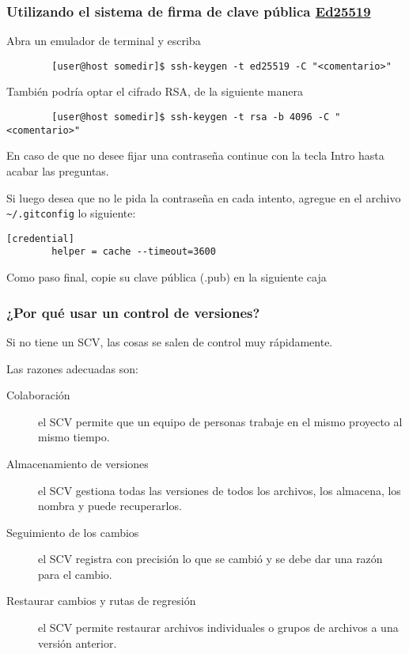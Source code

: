 \begin{frame}[fragile]
	\frametitle{Utilizando el sistema de firma de clave pública \href{https://ed25519.cr.yp.to}{Ed25519}}

	Abra un emulador de terminal y escriba

	\begin{verbatim}
		[user@host somedir]$ ssh-keygen -t ed25519 -C "<comentario>"
	\end{verbatim}

	También podría optar el cifrado RSA, de la siguiente manera

	\begin{verbatim}
		[user@host somedir]$ ssh-keygen -t rsa -b 4096 -C "<comentario>"
	\end{verbatim}

	En caso de que no desee fijar una contraseña continue con la
	tecla Intro hasta acabar las preguntas.

	Si luego desea que no le pida la contraseña en cada intento,
	agregue en el archivo \lstinline|~/.gitconfig| lo siguiente:

	\begin{verbatim}
[credential]
        helper = cache --timeout=3600
	\end{verbatim}

	Como paso final, copie su clave pública (.pub) en la siguiente
	caja
\end{frame}

\begin{frame}
	\frametitle{¿Por qué usar un control de versiones?}

	Si no tiene un SCV, las cosas se salen de control muy
	rápidamente.

	Las razones adecuadas son:
	\begin{description}
		\item[Colaboración]
		
		el SCV permite que un equipo de personas
			trabaje en el mismo proyecto al mismo tiempo.
		
			\item[Almacenamiento de versiones]
			
			el SCV gestiona todas las
			versiones de todos los archivos, los almacena, los nombra y
			puede recuperarlos.
		
			\item[Seguimiento de los cambios]
			
			el SCV registra con precisión
			lo que se cambió y se debe dar una razón para el cambio.
		
			\item[Restaurar cambios y rutas de regresión]
			
			el SCV permite
			restaurar archivos individuales o grupos de archivos a una
			versión anterior.
	\end{description}
\end{frame}

